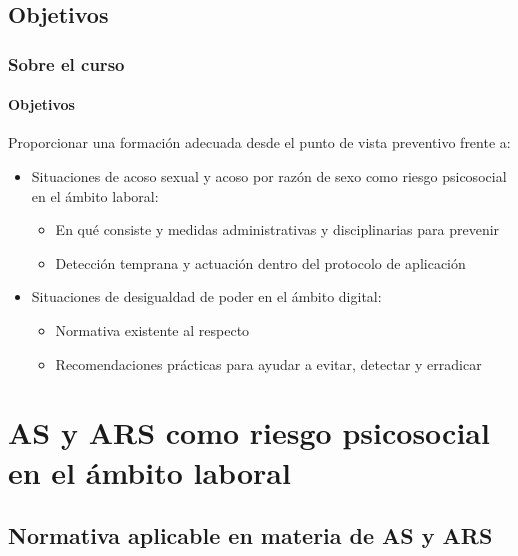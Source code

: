 \documentclass{beamer}
\newcommand{\highlight}[1]{{\color{Blue} #1}}
\begin{document}
    \subsection{Objetivos}

    \begin{frame}
        \frametitle{Sobre el curso}
        \framesubtitle{Objetivos}
        Proporcionar una \highlight{formación adecuada} desde el punto de vista preventivo frente a:
        \begin{itemize}
            \item Situaciones de \highlight{acoso sexual y acoso por razón de sexo} como riesgo psicosocial en el ámbito laboral:
            \begin{itemize}
                \item En qué consiste y medidas administrativas y disciplinarias para prevenir
                \item Detección temprana y actuación dentro del protocolo de aplicación
            \end{itemize}
            \item Situaciones de desigualdad de poder en el \highlight{ámbito digital}:
            \begin{itemize}
                \item Normativa existente al respecto
                \item Recomendaciones prácticas para ayudar a evitar, detectar y erradicar
            \end{itemize}
        \end{itemize}
    \end{frame}


    \section{AS y ARS como riesgo psicosocial en el ámbito laboral}

    \subsection{Normativa aplicable en materia de AS y ARS}
\end{document}
